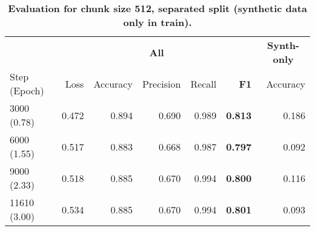 \begin{table}[H]
\centering
\small
\caption[Evaluation for Chunk Size 512, Separated Split]{\textbf{Evaluation for chunk size 512, separated split (synthetic data only in train). }}
\label{tab:512_separated}
\begin{tabular}{@{}lrrrr rr@{}}
\toprule
  & \multicolumn{5}{c}{\textbf{All}} 
  & \multicolumn{1}{c}{\textbf{Synth-only}} \\
\cmidrule(lr){2-6} \cmidrule(lr){7-7} 
Step (Epoch) & Loss & Accuracy & Precision & Recall & \textbf{F1} & Accuracy \\
\midrule
3000 (0.78) & 0.472 & 0.894 & 0.690 & 0.989 & \textbf{0.813} & 0.186 \\
6000 (1.55) & 0.517 & 0.883 & 0.668 & 0.987 & \textbf{0.797} & 0.092 \\
9000 (2.33) & 0.518 & 0.885 & 0.670 & 0.994 & \textbf{0.800} & 0.116 \\
11610 (3.00) & 0.534 & 0.885 & 0.670 & 0.994 & \textbf{0.801} & 0.093 \\
\bottomrule
\end{tabular}
\end{table}
